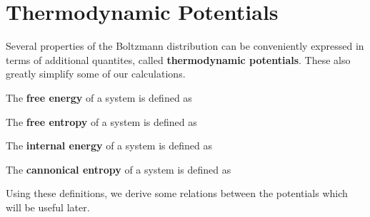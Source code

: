 \documentclass[letterpaper,english,12pt]{article}
\begin{document}
\section{Thermodynamic Potentials}
Several properties of the Boltzmann distribution can be conveniently expressed in terms of additional quantites, called \textbf{thermodynamic potentials}. These also greatly simplify some of our calculations. 
\begin{defn}
The \textbf{free energy} of a system is defined as 
\end{defn}
\begin{defn}
The \textbf{free entropy} of a system is defined as 
\end{defn}
\begin{defn}
The \textbf{internal energy} of a system is defined as 
\end{defn}
\begin{defn}
The \textbf{cannonical entropy} of a system is defined as 
\end{defn}
Using these definitions, we derive some relations between the potentials which will be useful later. 
\end{document}

